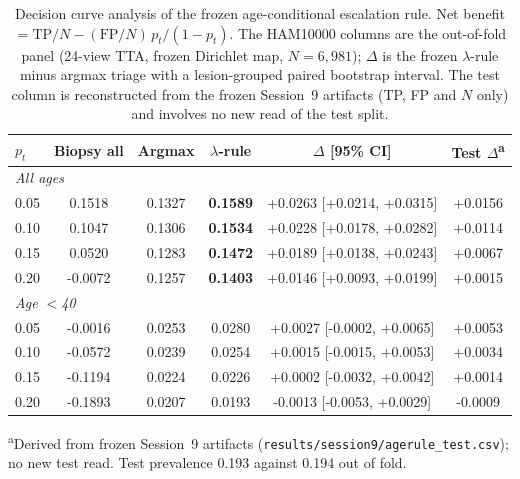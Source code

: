 \begin{table}[t]
\caption{Decision curve analysis of the frozen age-conditional escalation rule. Net benefit $=\mathrm{TP}/N-(\mathrm{FP}/N)\,p_t/(1-p_t)$. The HAM10000 columns are the out-of-fold panel (24-view TTA, frozen Dirichlet map, $N=6{,}981$); $\Delta$ is the frozen $\lambda$-rule minus argmax triage with a lesion-grouped paired bootstrap interval. The test column is reconstructed from the frozen Session~9 artifacts (TP, FP and $N$ only) and involves no new read of the test split.}
\label{tab:decision_curve}
\centering
\footnotesize
\begin{tabular}{lccccc}
\toprule
$p_t$ & Biopsy all & Argmax & $\lambda$-rule & $\Delta$ [95\% CI] & Test $\Delta$\textsuperscript{a} \\
\midrule
\multicolumn{6}{l}{\textit{All ages}} \\
0.05 & 0.1518 & 0.1327 & \textbf{0.1589} & +0.0263 [+0.0214, +0.0315] & +0.0156 \\
0.10 & 0.1047 & 0.1306 & \textbf{0.1534} & +0.0228 [+0.0178, +0.0282] & +0.0114 \\
0.15 & 0.0520 & 0.1283 & \textbf{0.1472} & +0.0189 [+0.0138, +0.0243] & +0.0067 \\
0.20 & -0.0072 & 0.1257 & \textbf{0.1403} & +0.0146 [+0.0093, +0.0199] & +0.0015 \\
\multicolumn{6}{l}{\textit{Age $<$40}} \\
0.05 & -0.0016 & 0.0253 & 0.0280 & +0.0027 [-0.0002, +0.0065] & +0.0053 \\
0.10 & -0.0572 & 0.0239 & 0.0254 & +0.0015 [-0.0015, +0.0053] & +0.0034 \\
0.15 & -0.1194 & 0.0224 & 0.0226 & +0.0002 [-0.0032, +0.0042] & +0.0014 \\
0.20 & -0.1893 & 0.0207 & 0.0193 & -0.0013 [-0.0053, +0.0029] & -0.0009 \\
\bottomrule
\end{tabular}
\vspace{1mm}
\parbox{\linewidth}{\raggedright \textsuperscript{a}Derived from frozen Session~9 artifacts (\texttt{results/session9/agerule\_test.csv}); no new test read. Test prevalence 0.193 against 0.194 out of fold.}
\end{table}
